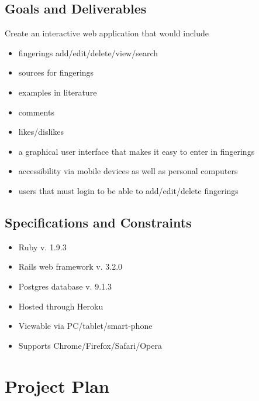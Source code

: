 \documentclass[12pt,english]{article}
\begin{document}
\subsection{Goals and Deliverables}
Create an interactive web application that would include 
\begin{itemize}
\item fingerings add/edit/delete/view/search 
\item sources for fingerings 
\item examples in literature 
\item comments 
\item likes/dislikes 
\item a graphical user interface that makes it easy to enter in fingerings 
\item accessibility via mobile devices as well as personal computers 
\item users that must login to be able to add/edit/delete fingerings 
\end{itemize}

\subsection{Specifications and Constraints}
\begin{itemize}
\item Ruby v. 1.9.3 
\item Rails web framework v. 3.2.0 
\item Postgres database v. 9.1.3 
\item Hosted through Heroku 
\item Viewable via PC/tablet/smart-phone 
\item Supports Chrome/Firefox/Safari/Opera 
\end{itemize}

\section{Project Plan}
\end{document}
